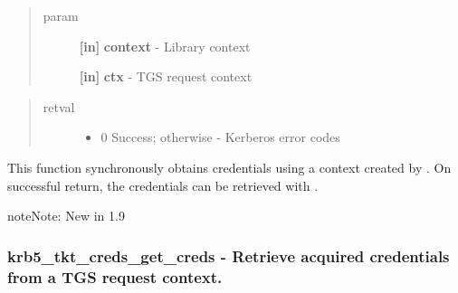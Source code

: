 \documentclass[letterpaper,10pt,english]{sphinxmanual}
\begin{document}
\begin{quote}\begin{description}
\item[{param}] \leavevmode
\textbf{{[}in{]}} \textbf{context} - Library context

\textbf{{[}in{]}} \textbf{ctx} - TGS request context

\end{description}\end{quote}
\begin{quote}\begin{description}
\item[{retval}] \leavevmode\begin{itemize}
\item {} 
0   Success; otherwise - Kerberos error codes

\end{itemize}

\end{description}\end{quote}

This function synchronously obtains credentials using a context created by {\hyperref[appdev/refs/api/krb5_tkt_creds_init:c.krb5_tkt_creds_init]{}} . On successful return, the credentials can be retrieved with {\hyperref[appdev/refs/api/krb5_tkt_creds_get_creds:c.krb5_tkt_creds_get_creds]{}} .

\begin{notice}{note}{Note:}
New in 1.9
\end{notice}


\subsubsection{krb5\_tkt\_creds\_get\_creds -  Retrieve acquired credentials from a TGS request context.}
\label{appdev/refs/api/krb5_tkt_creds_get_creds:krb5-tkt-creds-get-creds-retrieve-acquired-credentials-from-a-tgs-request-context}\label{appdev/refs/api/krb5_tkt_creds_get_creds::doc}

\begin{fulllineitems}
\label{appdev/refs/api/krb5_tkt_creds_get_creds:c.krb5_tkt_creds_get_creds}
\end{fulllineitems}
\end{document}
